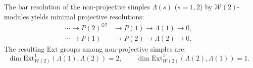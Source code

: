 \begin{proposition}
\label{prop:w2-ext-bar}
The bar resolution of the non-projective simples $\Lambda(s)$
\textup{($s = 1,2$)} by $\mathcal{W}(2)$-modules yields
minimal projective resolutions:
\begin{align}
\label{eq:w2-resolution-1}
\cdots \to P(2)^{\oplus 2} &\to P(1) \to \Lambda(1) \to 0, \\
\label{eq:w2-resolution-2}
\cdots \to P(1) &\to P(2) \to \Lambda(2) \to 0.
\end{align}
The resulting $\mathrm{Ext}$ groups among non-projective simples are:
\begin{equation}\label{eq:w2-ext}
\dim \mathrm{Ext}^1_{\mathcal{W}(2)}(\Lambda(1), \Lambda(2)) = 2,
\qquad
\dim \mathrm{Ext}^1_{\mathcal{W}(2)}(\Lambda(2), \Lambda(1)) = 1.
\end{equation}
\end{proposition}

